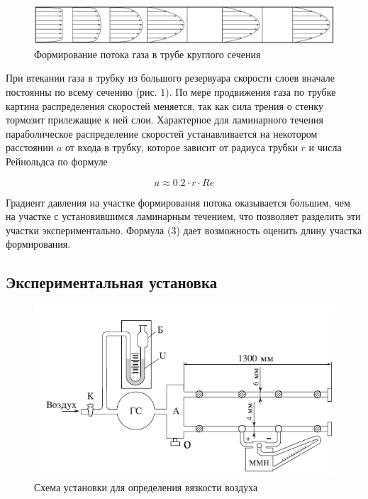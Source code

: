 \documentclass[12pt,a4paper]{article}
\begin{document}
	\begin{figure}[H]
		\begin{center}
			\includegraphics[width=12cm]{res/potok.png}
		\end{center}
		\caption{Формирование потока газа в трубе круглого сечения}
		\label{img1}
	\end{figure}	
	
	
	При втекании газа в трубку из большого резервуара скорости слоев вначале постоянны по всему сечению (рис. 1). По мере продвижения газа по трубке картина распределения скоростей меняется, так как сила трения о стенку тормозит прилежащие к ней слои. Характерное для ламинарного течения параболическое распределение скоростей устанавливается на некотором расстоянии $a$ от входа в трубку, которое зависит от радиуса трубки $r$ и числа Рейнольдса по формуле
	
	\begin{equation}
		a \approx  0.2 \cdot r \cdot Re
	\end{equation}

	Градиент давления на участке формирования потока оказывается большим, чем на участке с установившимся ламинарным течением, что позволяет разделить эти участки экспериментально. Формула (3) дает возможность оценить длину участка формирования.
	\subsection*{Экспериментальная установка}
	
	\begin{figure}[H]
		\begin{center}
			\includegraphics[width=12cm]{res/scheme.png}
		\end{center}
		\caption{Схема установки для определения вязкости воздуха}
		\label{img2}
	\end{figure}	
	
\end{document}
